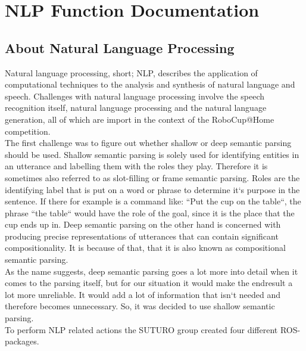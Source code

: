 \documentclass[main.tex]{subfiles}
\begin{document}
\renewcommand{\cleardoublepage}{}   
\renewcommand{\clearpage}{}
\newpage

\chapter{NLP Function Documentation}


\section{About Natural Language Processing}
    Natural language processing, short; NLP, describes the application of computational techniques to the analysis and synthesis of natural language and speech. Challenges with natural language processing involve the speech recognition itself, natural language processing and the natural language generation, all of which are import in the context of the RoboCup@Home competition.\\ 
    The first challenge was to figure out whether shallow or deep semantic parsing should be used. Shallow semantic parsing is solely used for identifying entities in an utterance and labelling them with the roles they play. Therefore it is sometimes also referred to as slot-filling or frame semantic parsing. Roles are the identifying label that is put on a word or phrase to determine it‘s purpose in the sentence. If there for example is a command like: “Put the cup on the table“, the phrase “the table“ would have the role of the goal, since it is the place that the cup ends up in.
Deep semantic parsing on the other hand is concerned with producing precise representations of utterances that can contain significant compositionality. It is because of that, that it is also known as compositional semantic parsing.\\ 
  As the name suggests, deep semantic parsing goes a lot more into detail when it comes to the parsing itself, but for our situation it would make the endresult a lot more unreliable. It would add a lot of information that isn‘t needed and therefore becomes unnecessary. So, it was decided to use shallow semantic parsing.\\
    
    To perform NLP related actions the SUTURO group created four different ROS-packages.
\end{document}

